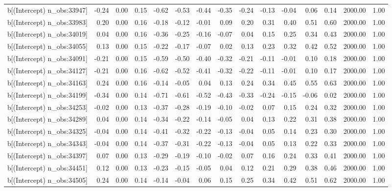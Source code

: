 \begin{table}[ht]
\begin{tabular}{rrrrrrrrrrrrrrr}
  b[(Intercept) n\_obs:33947] & -0.24 & 0.00 & 0.15 & -0.62 & -0.53 & -0.44 & -0.35 & -0.24 & -0.13 & -0.04 & 0.06 & 0.14 & 2000.00 & 1.00 \\ 
  b[(Intercept) n\_obs:33983] & 0.20 & 0.00 & 0.16 & -0.18 & -0.12 & -0.01 & 0.09 & 0.20 & 0.31 & 0.40 & 0.51 & 0.60 & 2000.00 & 1.00 \\ 
  b[(Intercept) n\_obs:34019] & 0.04 & 0.00 & 0.16 & -0.36 & -0.25 & -0.16 & -0.07 & 0.04 & 0.15 & 0.25 & 0.34 & 0.43 & 2000.00 & 1.00 \\ 
  b[(Intercept) n\_obs:34055] & 0.13 & 0.00 & 0.15 & -0.22 & -0.17 & -0.07 & 0.02 & 0.13 & 0.23 & 0.32 & 0.42 & 0.52 & 2000.00 & 1.00 \\ 
  b[(Intercept) n\_obs:34091] & -0.21 & 0.00 & 0.15 & -0.59 & -0.50 & -0.40 & -0.32 & -0.21 & -0.11 & -0.01 & 0.10 & 0.18 & 2000.00 & 1.00 \\ 
  b[(Intercept) n\_obs:34127] & -0.21 & 0.00 & 0.16 & -0.62 & -0.52 & -0.41 & -0.32 & -0.22 & -0.11 & -0.01 & 0.10 & 0.17 & 2000.00 & 1.00 \\ 
  b[(Intercept) n\_obs:34163] & 0.24 & 0.00 & 0.16 & -0.14 & -0.05 & 0.04 & 0.13 & 0.24 & 0.34 & 0.45 & 0.55 & 0.63 & 2000.00 & 1.00 \\ 
  b[(Intercept) n\_obs:34199] & -0.34 & 0.00 & 0.14 & -0.71 & -0.61 & -0.52 & -0.43 & -0.33 & -0.24 & -0.15 & -0.06 & 0.02 & 2000.00 & 1.00 \\ 
  b[(Intercept) n\_obs:34253] & -0.02 & 0.00 & 0.13 & -0.37 & -0.28 & -0.19 & -0.10 & -0.02 & 0.07 & 0.15 & 0.24 & 0.32 & 2000.00 & 1.00 \\ 
  b[(Intercept) n\_obs:34289] & 0.04 & 0.00 & 0.14 & -0.34 & -0.22 & -0.14 & -0.05 & 0.04 & 0.13 & 0.22 & 0.31 & 0.38 & 2000.00 & 1.00 \\ 
  b[(Intercept) n\_obs:34325] & -0.04 & 0.00 & 0.14 & -0.41 & -0.32 & -0.22 & -0.13 & -0.04 & 0.05 & 0.14 & 0.23 & 0.30 & 2000.00 & 1.00 \\ 
  b[(Intercept) n\_obs:34343] & -0.04 & 0.00 & 0.14 & -0.37 & -0.31 & -0.22 & -0.13 & -0.04 & 0.05 & 0.13 & 0.22 & 0.33 & 2000.00 & 1.00 \\ 
  b[(Intercept) n\_obs:34397] & 0.07 & 0.00 & 0.13 & -0.29 & -0.19 & -0.10 & -0.02 & 0.07 & 0.16 & 0.24 & 0.33 & 0.41 & 2000.00 & 1.00 \\ 
  b[(Intercept) n\_obs:34451] & 0.12 & 0.00 & 0.13 & -0.23 & -0.15 & -0.05 & 0.04 & 0.12 & 0.21 & 0.29 & 0.38 & 0.46 & 2000.00 & 1.00 \\ 
  b[(Intercept) n\_obs:34505] & 0.24 & 0.00 & 0.14 & -0.14 & -0.04 & 0.06 & 0.15 & 0.25 & 0.34 & 0.42 & 0.51 & 0.62 & 2000.00 & 1.00 \\ 

\end{tabular}
\end{table}
